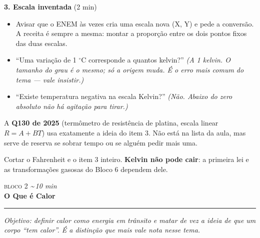 \documentclass[11pt,a4paper]{article}
\newcommand{\bloco}[3]{%
  \needspace{7\baselineskip}
  \vspace{1.8em}
  {\scshape\color{vinho}bloco #1}\hfill
    {\small\itshape\color{grafite}\textasciitilde\,#3 min}\\[0.1em]
  {\Large\bfseries #2}\\[-0.55em]
  {\color{black!30}\rule{\linewidth}{0.5pt}}
  \par\nobreak\smallskip
}
\newcommand{\objetivo}[1]{{\itshape\color{grafite}Objetivo: #1}\par\smallskip}
\begin{document}
\begin{quadro}
\medskip
\textbf{3. Escala inventada} (2 min)
\begin{itemize}[nosep]
  \item Avisar que o ENEM \`as vezes cria uma escala nova (X, Y) e pede a
        convers\~ao. A receita \'e sempre a mesma: montar a propor\c{c}\~ao entre
        os dois pontos fixos das duas escalas.
\end{itemize}
\end{quadro}

\begin{perguntas}
\begin{itemize}[nosep]
  \item ``Uma varia\c{c}\~ao de 1 $^\circ$C corresponde a quantos kelvin?''
        \textit{(A 1 kelvin. O tamanho do grau \'e o mesmo; s\'o a origem
        muda. \'E o erro mais comum do tema --- vale insistir.)}
  \item ``Existe temperatura negativa na escala Kelvin?''
        \textit{(N\~ao. Abaixo do zero absoluto n\~ao h\'a agita\c{c}\~ao para
        tirar.)}
\end{itemize}
\end{perguntas}

\begin{obs}
A \textbf{Q130 de 2025} (term\^ometro de resist\^encia de platina, escala
linear $R = A + BT$) usa exatamente a ideia do item 3. N\~ao est\'a na lista
da aula, mas serve de reserva se sobrar tempo ou se algu\'em pedir mais
uma.
\end{obs}

\begin{corte}
Cortar o Fahrenheit e o item 3 inteiro. \textbf{Kelvin n\~ao pode cair}: a
primeira lei e as transforma\c{c}\~oes gasosas do Bloco 6 dependem dele.
\end{corte}

\bloco{2}{O Que \'e Calor}{10}

\objetivo{definir calor como energia em tr\^ansito e matar de vez a ideia
de que um corpo ``tem calor''. \'E a distin\c{c}\~ao que mais vale nota nesse
tema.}
\end{document}
